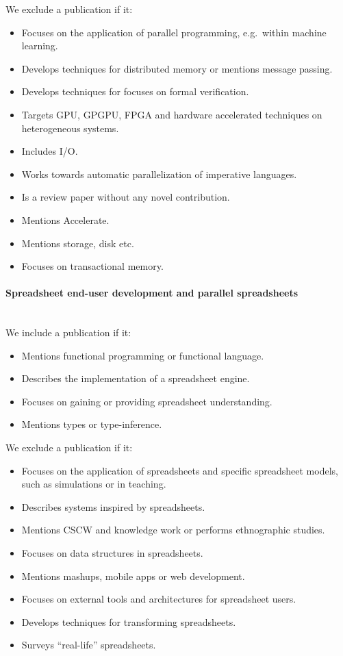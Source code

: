 \documentclass[a4paper]{article}
\begin{document}
We exclude a publication if it:

\begin{itemize}
\item Focuses on the application of parallel programming, e.g.\ within
  machine learning.
\item Develops techniques for distributed memory or mentions message
  passing.
\item Develops techniques for focuses on formal verification.
\item Targets GPU, GPGPU, FPGA and hardware accelerated techniques on
  heterogeneous systems.
\item Includes I/O.
\item Works towards automatic parallelization of imperative languages.
\item Is a review paper without any novel contribution.
\item Mentions Accelerate.
\item Mentions storage, disk etc.
\item Focuses on transactional memory.
\end{itemize}

\paragraph{Spreadsheet end-user development and parallel spreadsheets}
~\\

We include a publication if it:

\begin{itemize}
\item Mentions functional programming or functional language.
\item Describes the implementation of a spreadsheet engine.
\item Focuses on gaining or providing spreadsheet understanding.
\item Mentions types or type-inference.
\end{itemize}

We exclude a publication if it:

\begin{itemize}
\item Focuses on the application of spreadsheets and specific
  spreadsheet models, such as simulations or in teaching.
\item Describes systems inspired by spreadsheets.
\item Mentions CSCW and knowledge work or performs ethnographic
  studies.
\item Focuses on data structures in spreadsheets.
\item Mentions mashups, mobile apps or web development.
\item Focuses on external tools and architectures for spreadsheet
  users.
\item Develops techniques for transforming spreadsheets.
\item Surveys ``real-life'' spreadsheets.
\end{itemize}
\end{document}
